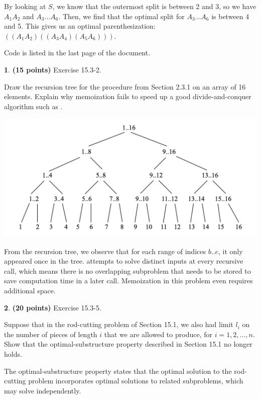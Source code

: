 \documentclass[11pt]{article}
\theoremstyle{definition}
\theoremstyle{theorem}
\newtheorem{prob}{}
\newcommand{\solution}{\medskip\noindent{\color{DarkBlue}\textbf{Solution:}}}
\begin{document}
By looking at $S$, we know that the outermost split is between 2 and 3, so we have $A_1A_2$ and $A_3...A_6$. Then, we find that the optimal split for $A_3...A_6$ is between 4 and 5. This gives us an optimal parenthesization: $((A_1 A_2) ((A_3 A_4) (A_5 A_6)))$.

Code is listed in the last page of the document.

\newpage
\begin{prob} \textbf{(15 points)} Exercise 15.3-2.
\end{prob}
Draw the recursion tree for the  procedure from Section 2.3.1 on an array of 16 elements. Explain why memoization fails to speed up a good divide-and-conquer algorithm such as .

\solution

\includegraphics[scale=0.7]{hw5q2.png}

From the recursion tree, we observe that for each range of indices $b..e$, it only appeared once in the tree.  attempts to solve distinct inputs at every recursive call, which means there is no overlapping subproblem that needs to be stored to save computation time in a later call. Memoization in this problem even requires additional space.


\newpage
\begin{prob} \textbf{(20 points)} Exercise 15.3-5.
\end{prob}
Suppose that in the rod-cutting problem of Section 15.1, we also had limit $l_i$ on the number of pieces of length $i$ that we are allowed to produce, for $i = 1, 2, ..., n$. Show that the optimal-substructure property described in Section 15.1 no longer holds.

\solution

The optimal-substructure property states that the optimal solution to the rod-cutting problem incorporates optimal solutions to related subproblems, which may solve independently. 
\end{document}
